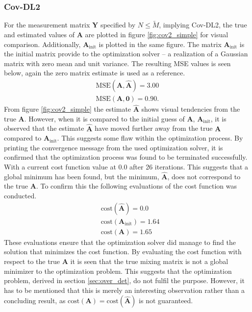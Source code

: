 \subsubsection{Cov-DL2}
For the measurement matrix $\mathbf{Y}$ specified by $N \leq \widetilde{M}$, implying Cov-DL2, the true and estimated values of $\mathbf{A}$ are plotted in figure \ref{fig:cov2_simple} for visual comparison. 
Additionally, $\mathbf{A}_{\text{init}}$ is plotted in the same figure. 
The matrix $\mathbf{A}_{\text{init}}$ is the initial matrix provide to the optimization solver -- a realization of a Gaussian matrix with zero mean and unit variance. 
The resulting MSE values is seen below, again the zero matrix estimate is used as a reference. 
\begin{align*}
\text{MSE}(\mathbf{A}, \hat{\mathbf{A}}) = 3.00 \\
\text{MSE}(\mathbf{A}, \mathbf{0}) = 0.90.
\end{align*}
From figure \ref{fig:cov2_simple} the estimate $\hat{\mathbf{A}}$ shows visual tendencies from the true $\mathbf{A}$. 
However, when it is compared to the initial guess of $\mathbf{A}$, $\mathbf{A}_{\text{init}}$, it is observed that the estimate $\hat{\mathbf{A}}$ have moved further away from the true $\mathbf{A}$ compared to $\mathbf{A}_{\text{init}}$. 
This suggests some flaw within the optimization process. 
By printing the convergence message from the used optimization solver, it is confirmed that the optimization process was found to be terminated successfully. 
With a current cost function value at $0.0$ after 26 iterations. 
This suggests that a global minimum has been found, but the minimum, $\hat{\mathbf{A}}$, does not correspond to the true $\mathbf{A}$. 
To confirm this the following evaluations of the cost function was conducted. 
\begin{align*}
&\text{cost}(\hat{\mathbf{A}}) = 0.0\\
&\text{cost}(\mathbf{A}_{\text{init}}) = 1.64\\
&\text{cost}(\mathbf{A}) = 1.65
\end{align*}
These evaluations ensure that the optimization solver did manage to find the solution that minimizes the cost function. 
By evaluating the cost function with respect to the true $\mathbf{A}$ it is seen that the true mixing matrix is not a global minimizer to the optimization problem. 
This suggests that the optimization problem, derived in section \ref{sec:over_det}, do not fulfil the purpose.
However, it has to be mentioned that this is merely an interesting observation rather than a concluding result, as $\text{cost}(\mathbf{A}) = \text{cost}(\hat{\mathbf{A}})$ is not guaranteed. 
